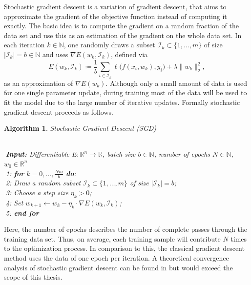 \documentclass[11pt, a4paper]{article}
\newtheorem{algorithm}[theorem]{Algorithm}
\newcommand{\N}{\mathbb{N}}
\newcommand{\R}{\mathbb{R}}
\newcommand{\I}{\mathcal{I}}
\begin{document}
Stochastic gradient descent is a variation of gradient descent, that aims to approximate the gradient of the objective function instead of computing it exactly. The basic idea is to compute the gradient on a random fraction of the data set and use this as an estimation of the gradient on the whole data set. In each iteration $k \in \N$, one randomly draws a subset $\I_k \subset \{ 1, \dots, m \}$ of size $| \I_k | = b \in \N$ and uses $\nabla E(w_k,\I_k)$, defined via
\[ E(w_k,\I_k) \coloneq \frac{1}{b} \sum_{i \in \I_k}^{} \ell \big ( f(x_i,w_k),y_i \big) + \lambda \big \| w_k \big \|_2^2, \]
as an approximation of $\nabla E(w_k)$. Although only a small amount of data is used for one single parameter update, during training most of the data will be used to fit the model due to the large number of iterative updates. Formally stochastic gradient descent proceeds as follows.

\begin{algorithm} 
\caption{Stochastic Gradient Descent (SGD) \textcolor{white}{$\Big |$}} \ \\
\textcolor{white}{$\Big |$}\textbf{Input:} Differentiable $E: \R^n \to \R$, batch size $b \in \N$, number of epochs $N \in \N$, $w_0 \in \R^n$ \\
\textcolor{white}{$\Big |$}1: \textbf{for} $k=0, \dots, \frac{Nm}{b}$ \textbf{do}: \\
\textcolor{white}{$\Big |$}2: \quad Draw a random subset $\I_k \subset \{1, \dots, m \}$ of size $| \I_k | = b$; \\
\textcolor{white}{$\Big |$}3: \quad Choose a step size $\eta_k > 0$; \\
\textcolor{white}{$\Big |$}4: \quad Set $w_{k+1} \leftarrow w_k - \eta_k \cdot \nabla E(w_k,\I_k)$; \\
\textcolor{white}{$\Big |$}5: \textbf{end for}
\end{algorithm}

Here, the number of epochs describes the number of complete passes through the training data set. Thus, on average, each  training sample will contribute $N$ times to the optimization process. In comparison to this, the classical gradient descent method uses the data of one epoch per iteration. A theoretical convergence analysis of stochastic gradient descent can be found in \cite{SGD} but would exceed the scope of this thesis. \\
\end{document}
